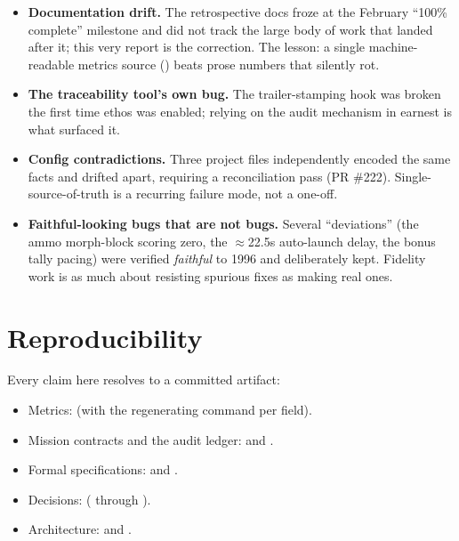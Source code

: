 \documentclass[11pt,a4paper]{article}
\begin{document}
\begin{itemize}[nosep]
  \item \textbf{Documentation drift.} The retrospective docs froze at the
        February ``100\% complete'' milestone and did not track the large
        body of work that landed after it; this very report is the
        correction. The lesson: a single machine-readable metrics source
        () beats prose numbers that silently
        rot.
  \item \textbf{The traceability tool's own bug.} The trailer-stamping
        hook was broken the first time ethos was enabled; relying on the
        audit mechanism in earnest is what surfaced it.
  \item \textbf{Config contradictions.} Three project files independently
        encoded the same facts and drifted apart, requiring a
        reconciliation pass (PR \#222). Single-source-of-truth is a
        recurring failure mode, not a one-off.
  \item \textbf{Faithful-looking bugs that are not bugs.} Several
        ``deviations'' (the ammo morph-block scoring zero, the
        $\approx$22.5s auto-launch delay, the bonus tally pacing) were
        verified \emph{faithful} to 1996 and deliberately kept. Fidelity
        work is as much about resisting spurious fixes as making real ones.
\end{itemize}

\section{Reproducibility}

Every claim here resolves to a committed artifact:

\begin{itemize}[nosep]
  \item Metrics:  (with the regenerating command per field).
  \item Mission contracts and the audit ledger:
         and
        .
  \item Formal specifications:  and
        .
  \item Decisions:  ( through ).
  \item Architecture:  and
        .
\end{itemize}
\end{document}

